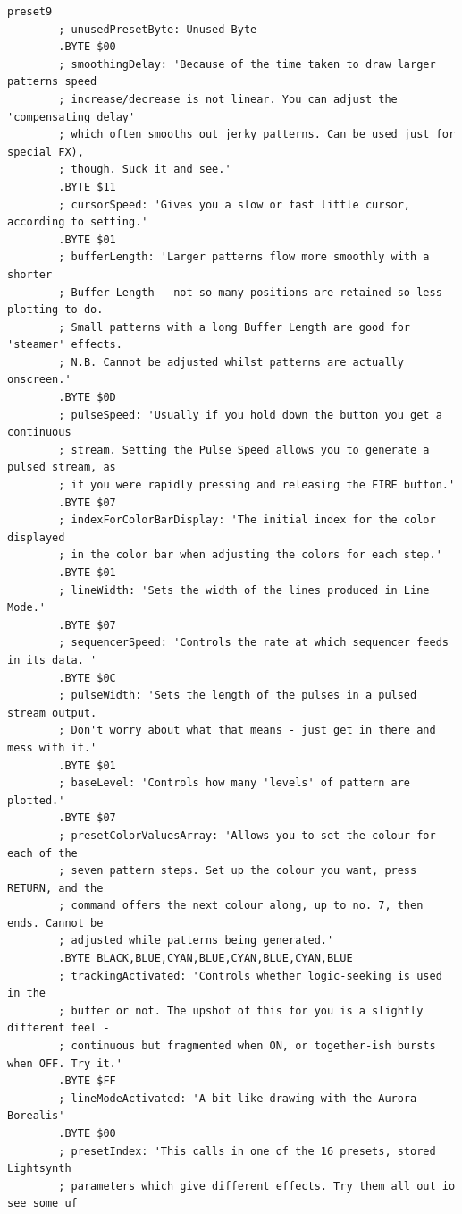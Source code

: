 \begin{lstlisting}[basicstyle=\tiny,caption=Source code for Preset 9.]
preset9
        ; unusedPresetByte: Unused Byte
        .BYTE $00
        ; smoothingDelay: 'Because of the time taken to draw larger patterns speed
        ; increase/decrease is not linear. You can adjust the 'compensating delay'
        ; which often smooths out jerky patterns. Can be used just for special FX),
        ; though. Suck it and see.'
        .BYTE $11
        ; cursorSpeed: 'Gives you a slow or fast little cursor, according to setting.'
        .BYTE $01
        ; bufferLength: 'Larger patterns flow more smoothly with a shorter
        ; Buffer Length - not so many positions are retained so less plotting to do.
        ; Small patterns with a long Buffer Length are good for 'steamer' effects.
        ; N.B. Cannot be adjusted whilst patterns are actually onscreen.'
        .BYTE $0D
        ; pulseSpeed: 'Usually if you hold down the button you get a continuous
        ; stream. Setting the Pulse Speed allows you to generate a pulsed stream, as
        ; if you were rapidly pressing and releasing the FIRE button.'
        .BYTE $07
        ; indexForColorBarDisplay: 'The initial index for the color displayed
        ; in the color bar when adjusting the colors for each step.'
        .BYTE $01
        ; lineWidth: 'Sets the width of the lines produced in Line Mode.'
        .BYTE $07
        ; sequencerSpeed: 'Controls the rate at which sequencer feeds in its data. '
        .BYTE $0C
        ; pulseWidth: 'Sets the length of the pulses in a pulsed stream output.
        ; Don't worry about what that means - just get in there and mess with it.'
        .BYTE $01
        ; baseLevel: 'Controls how many 'levels' of pattern are plotted.'
        .BYTE $07
        ; presetColorValuesArray: 'Allows you to set the colour for each of the
        ; seven pattern steps. Set up the colour you want, press RETURN, and the
        ; command offers the next colour along, up to no. 7, then ends. Cannot be
        ; adjusted while patterns being generated.'
        .BYTE BLACK,BLUE,CYAN,BLUE,CYAN,BLUE,CYAN,BLUE
        ; trackingActivated: 'Controls whether logic-seeking is used in the
        ; buffer or not. The upshot of this for you is a slightly different feel -
        ; continuous but fragmented when ON, or together-ish bursts when OFF. Try it.'
        .BYTE $FF
        ; lineModeActivated: 'A bit like drawing with the Aurora Borealis'
        .BYTE $00
        ; presetIndex: 'This calls in one of the 16 presets, stored Lightsynth
        ; parameters which give different effects. Try them all out io see some uf

\end{lstlisting}
